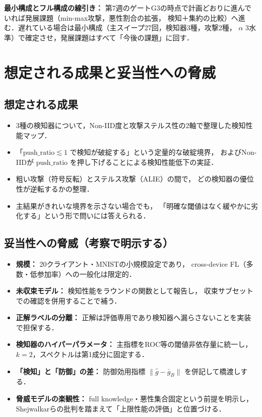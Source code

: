 \documentclass[a4j, dvipdfmx]{jsarticle}  %
\begin{document}
\noindent
\textbf{最小構成とフル構成の線引き：}
第7週のゲートG3の時点で計画どおりに進んでいれば発展課題（min-max攻撃，悪性割合の拡張，
検知＋集約の比較）へ進む．遅れている場合は最小構成（主スイープ27回，検知器3種，攻撃2種，
$\alpha$ 3水準）で確定させ，発展課題はすべて「今後の課題」に回す．

\section{想定される成果と妥当性への脅威}

\subsection{想定される成果}

\begin{itemize}
  \item 3種の検知器について，Non-IID度と攻撃ステルス性の2軸で整理した検知性能マップ．
  \item 「$\mathrm{push\_ratio} \lesssim 1$ で検知が破綻する」という定量的な破綻境界，
        およびNon-IIDが $\mathrm{push\_ratio}$ を押し下げることによる検知性能低下の実証．
  \item 粗い攻撃（符号反転）とステルス攻撃（ALIE）の間で，
        どの検知器の優位性が逆転するかの整理．
  \item 主結果がきれいな境界を示さない場合でも，
        「明確な閾値はなく緩やかに劣化する」という形で問いには答えられる．
\end{itemize}

\subsection{妥当性への脅威（考察で明示する）}

\begin{itemize}
  \item \textbf{規模：} 20クライアント・MNISTの小規模設定であり，
        cross-device FL（多数・低参加率）への一般化は限定的．
  \item \textbf{未収束モデル：} 検知性能をラウンドの関数として報告し，
        収束サブセットでの確認を併用することで補う．
  \item \textbf{正解ラベルの分離：} 正解は評価専用であり検知器へ漏らさないことを実装で担保する．
  \item \textbf{検知器のハイパーパラメータ：} 主指標をROC等の閾値非依存量に統一し，
        $k=2$，スペクトルは第1成分に固定する．
  \item \textbf{「検知」と「防御」の差：} 防御効用指標
        $\|\hat{g} - \bar{g}_B\|$ を併記して橋渡しする．
  \item \textbf{脅威モデルの楽観性：} full knowledge・悪性集合固定という前提を明示し，
        Shejwalkarら\cite{shejwalkar2022back}の批判を踏まえて「上限性能の評価」と位置づける．
\end{itemize}
\end{document}
